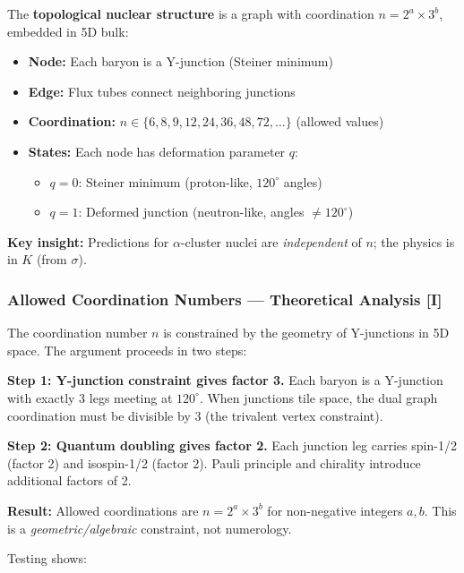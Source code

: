 \begin{tcolorbox}[colback=yellow!5!white, colframe=yellow!75!black, title=Definition: Topological Nuclear Structure {[I]}]
The \textbf{topological nuclear structure} is a graph with coordination $n = 2^a \times 3^b$, embedded in 5D bulk:
\begin{itemize}
    \item \textbf{Node:} Each baryon is a Y-junction (Steiner minimum)
    \item \textbf{Edge:} Flux tubes connect neighboring junctions
    \item \textbf{Coordination:} $n \in \{6, 8, 9, 12, 24, 36, 48, 72, \ldots\}$ (allowed values)
    \item \textbf{States:} Each node has deformation parameter $q$:
    \begin{itemize}
        \item $q = 0$: Steiner minimum (proton-like, $120^\circ$ angles)
        \item $q = 1$: Deformed junction (neutron-like, angles $\neq 120^\circ$)
    \end{itemize}
\end{itemize}
\textbf{Key insight:} Predictions for $\alpha$-cluster nuclei are \emph{independent} of $n$; the physics is in $K$ (from $\sigma$).
\end{tcolorbox}

\subsubsection{Allowed Coordination Numbers --- Theoretical Analysis [I]}

The coordination number $n$ is constrained by the geometry of Y-junctions in 5D space. The argument proceeds in two steps:

\textbf{Step 1: Y-junction constraint gives factor 3.} Each baryon is a Y-junction with exactly 3 legs meeting at $120^\circ$. When junctions tile space, the dual graph coordination must be divisible by 3 (the trivalent vertex constraint).

\textbf{Step 2: Quantum doubling gives factor 2.} Each junction leg carries spin-1/2 (factor 2) and isospin-1/2 (factor 2). Pauli principle and chirality introduce additional factors of 2.

\textbf{Result:} Allowed coordinations are $n = 2^a \times 3^b$ for non-negative integers $a, b$. This is a \emph{geometric/algebraic} constraint, not numerology.

Testing shows:

